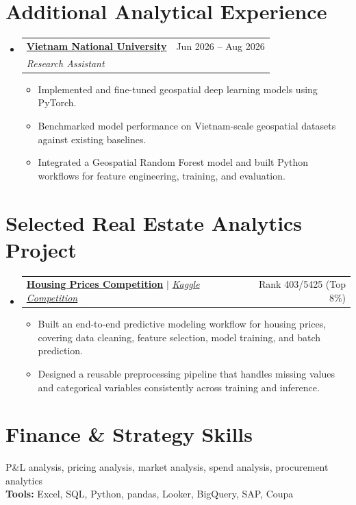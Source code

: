 \documentclass[a4paper,11pt]{article}
\makeatletter
\newcommand{\resumeItem}[1]{
  \item\small{
    {#1 \vspace{-2pt}}
  }
}
\newcommand{\resumeSubheading}[4]{
  \vspace{-2pt}\item
    \begin{tabular*}{0.97\textwidth}[t]{l@{\extracolsep{\fill}}r}
      \textbf{#1} & #2 \\
      \textit{\small#3} & \textit{\small #4} \\
    \end{tabular*}\vspace{-7pt}
}
\newcommand{\resumeProjectHeading}[2]{
  \item
    \begin{tabular*}{0.97\textwidth}{l@{\extracolsep{\fill}}r}
      \small#1 & #2 \\
    \end{tabular*}\vspace{-7pt}
}
\newcommand{\resumeSubHeadingListStart}{\begin{itemize}[leftmargin=0.15in, label={}]}
\newcommand{\resumeSubHeadingListEnd}{\end{itemize}}
\newcommand{\resumeItemListStart}{\begin{itemize}}
\newcommand{\resumeItemListEnd}{\end{itemize}\vspace{-5pt}}
\makeatother
\begin{document}
\section{Additional Analytical Experience}
\resumeSubHeadingListStart
  \resumeSubheading
    {\href{https://en.vnu.edu.vn/}{Vietnam National University}}{Jun 2026 -- Aug 2026}
    {Research Assistant}{}
    \resumeItemListStart
      \resumeItem{Implemented and fine-tuned geospatial deep learning models using PyTorch.}
      \resumeItem{Benchmarked model performance on Vietnam-scale geospatial datasets against existing baselines.}
      \resumeItem{Integrated a Geospatial Random Forest model and built Python workflows for feature engineering, training, and evaluation.}
    \resumeItemListEnd
\resumeSubHeadingListEnd

\section{Selected Real Estate Analytics Project}
\resumeSubHeadingListStart
  \resumeProjectHeading
    {\textbf{\href{https://github.com/lhnminh/Kaggle-Housing-Prices-Comp}{Housing Prices Competition}} $|$ \emph{\href{https://www.kaggle.com/competitions/home-data-for-ml-course/overview}{Kaggle Competition}}}{Rank 403/5425 (Top 8\%)}
    \resumeItemListStart
      \resumeItem{Built an end-to-end predictive modeling workflow for housing prices, covering data cleaning, feature selection, model training, and batch prediction.}
      \resumeItem{Designed a reusable preprocessing pipeline that handles missing values and categorical variables consistently across training and inference.}
    \resumeItemListEnd
\resumeSubHeadingListEnd

\section{Finance \& Strategy Skills}
 P\&L analysis, pricing analysis, market analysis, spend analysis, procurement analytics\\
{\bfseries Tools:} Excel, SQL, Python, pandas, Looker, BigQuery, SAP, Coupa
\end{document}
